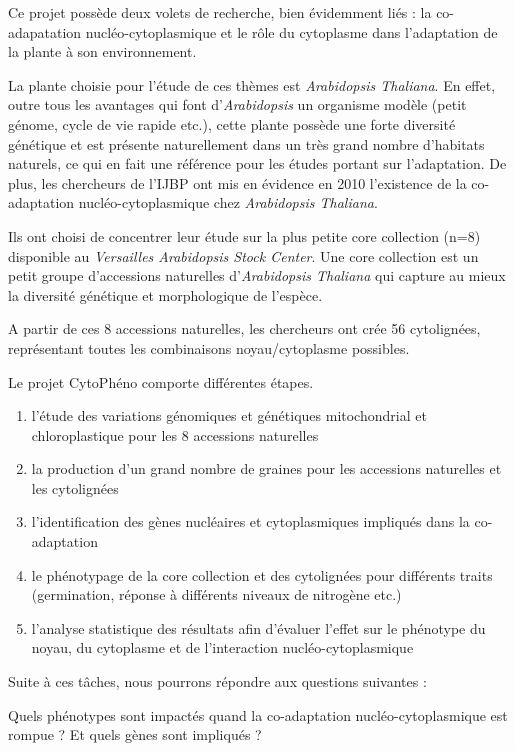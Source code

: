 \documentclass[a4paper]{article}
\begin{document}
Ce projet possède deux volets de recherche, bien évidemment liés : la co-adapatation nucléo-cytoplasmique et le rôle du cytoplasme dans l'adaptation de la plante à son environnement. 

La plante choisie pour l'étude de ces thèmes est \textit{Arabidopsis Thaliana}. En effet, outre tous les avantages qui font d'\textit{Arabidopsis} un organisme modèle (petit génome, cycle de vie rapide etc.), cette plante possède une forte diversité génétique et est présente naturellement dans un très grand nombre d'habitats naturels, ce qui en fait une référence pour les études portant sur l'adaptation. De plus, les chercheurs de l'IJBP ont mis en évidence en 2010 l'existence de la co-adaptation nucléo-cytoplasmique chez \textit{Arabidopsis Thaliana}.\cite{moison2010cytoplasmic}

Ils ont choisi de concentrer leur étude sur la plus petite core collection (n=8) disponible au \textit{Versailles Arabidopsis Stock Center}. Une core collection est un petit groupe d'accessions naturelles d'\textit{Arabidopsis Thaliana} qui capture au mieux la diversité génétique et morphologique de l'espèce.\cite{mckhann2004nested}

A partir de ces 8 accessions naturelles, les chercheurs ont crée 56 cytolignées, représentant toutes les combinaisons noyau/cytoplasme possibles. 

Le projet CytoPhéno comporte différentes étapes.

\begin{enumerate}
	\item l'étude des variations génomiques et génétiques mitochondrial et chloroplastique pour les 8 accessions naturelles
\item la production d'un grand nombre de graines pour les accessions naturelles et les cytolignées
\item l'identification des gènes nucléaires et cytoplasmiques impliqués dans la co-adaptation  
\item le phénotypage de la core collection et des cytolignées pour différents traits (germination, réponse à différents niveaux de nitrogène etc.)
\item l'analyse statistique des résultats afin d'évaluer l'effet sur le phénotype du noyau, du cytoplasme et de l'interaction nucléo-cytoplasmique
\end{enumerate}

Suite à ces tâches, nous pourrons répondre aux questions suivantes :  

Quels phénotypes sont impactés quand la co-adaptation nucléo-cytoplasmique est rompue ? Et quels gènes sont impliqués ?
\end{document}
